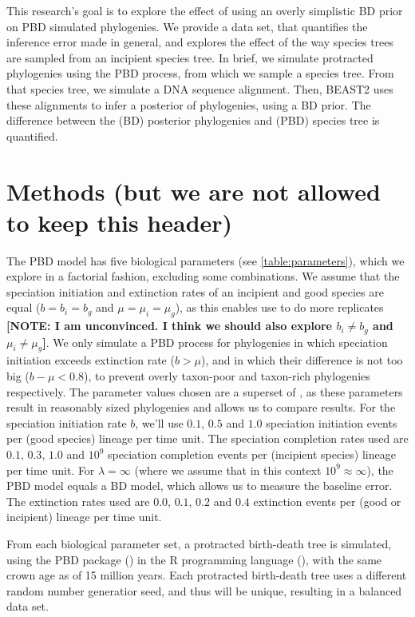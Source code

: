 \documentclass{article}
\begin{document}
This research's goal is to explore the effect of using an overly simplistic
BD prior on PBD simulated phylogenies. We provide a data set, 
that quantifies the inference error made in general, and explores
the effect of the way species trees are sampled from an incipient species tree.  
In brief, we simulate protracted phylogenies using the PBD process,
from which we sample a species tree. From that species tree, 
we simulate a DNA sequence alignment. Then, BEAST2 uses these alignments
to infer a posterior of phylogenies, using a BD prior. The difference
between the (BD) posterior phylogenies and (PBD) species tree is quantified.

\section{Methods (but we are not allowed to keep this header)}

The PBD model has five biological parameters (see \ref{table:parameters}), 
which we explore in a factorial fashion, excluding some combinations. 
We assume that the speciation initiation and extinction rates
of an incipient and good species are equal ($b = b_i = b_g$ and $\mu = \mu_i = \mu_g$),
as this enables use to do more replicates 
\textbf{[NOTE: I am unconvinced. I think we should also explore $b_i \neq b_g$ and $\mu_i \neq \mu_g$]}.
We only simulate a PBD process for phylogenies in which
speciation initiation exceeds extinction rate ($b > \mu$),
and in which their difference is not too big ($b - \mu < 0.8$), 
to prevent overly taxon-poor and taxon-rich phylogenies respectively.
The parameter values chosen are a 
superset of \cite{etienne2014}, as these parameters result in reasonably
sized phylogenies and allows us to compare results. 
For the speciation initiation rate $b$, we'll use $0.1$, $0.5$ and $1.0$ 
speciation initiation events per (good species) lineage per time unit.
The speciation completion rates used are $0.1$, $0.3$, $1.0$ and $10^9$ speciation completion
events per (incipient species) lineage per time unit. For 
$\lambda = \infty$ (where we assume that in this context $10^9 \approx \infty$), 
the PBD model equals a BD model, which allows us to measure the baseline error.
The extinction rates used are $0.0$, $0.1$, $0.2$ and $0.4$ 
extinction events per (good or incipient) lineage per time unit.

From each biological parameter set, a protracted birth-death tree is simulated,
using the PBD package (\cite{pbd}) in the R programming language (\cite{r}), 
with the same crown age as \cite{etienne2014} of 15 million years. 
Each protracted birth-death tree uses a different random number
generatior seed, and thus will be unique, resulting in a balanced 
data set. 
\end{document}
